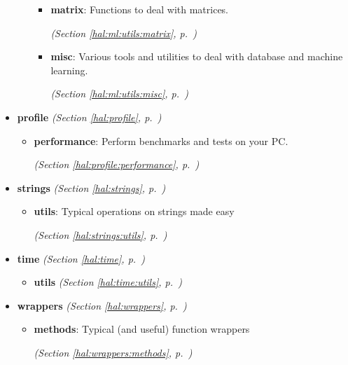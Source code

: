 \begin{itemize}
\begin{itemize}
      \begin{itemize}
    \setlength{\parskip}{0ex}
        \item \textbf{matrix}: Functions to deal with matrices. 


  \textit{(Section \ref{hal:ml:utils:matrix}, p.~\pageref{hal:ml:utils:matrix})}

        \item \textbf{misc}: Various tools and utilities to deal with database and machine learning. 


  \textit{(Section \ref{hal:ml:utils:misc}, p.~\pageref{hal:ml:utils:misc})}

      \end{itemize}
  \end{itemize}
\item \textbf{profile}
  \textit{(Section \ref{hal:profile}, p.~\pageref{hal:profile})}

  \begin{itemize}
\setlength{\parskip}{0ex}
    \item \textbf{performance}: Perform benchmarks and tests on your PC. 


  \textit{(Section \ref{hal:profile:performance}, p.~\pageref{hal:profile:performance})}

  \end{itemize}
\item \textbf{strings}
  \textit{(Section \ref{hal:strings}, p.~\pageref{hal:strings})}

  \begin{itemize}
\setlength{\parskip}{0ex}
    \item \textbf{utils}: Typical operations on strings made easy 


  \textit{(Section \ref{hal:strings:utils}, p.~\pageref{hal:strings:utils})}

  \end{itemize}
\item \textbf{time}
  \textit{(Section \ref{hal:time}, p.~\pageref{hal:time})}

  \begin{itemize}
\setlength{\parskip}{0ex}
    \item \textbf{utils}
  \textit{(Section \ref{hal:time:utils}, p.~\pageref{hal:time:utils})}

  \end{itemize}
\item \textbf{wrappers}
  \textit{(Section \ref{hal:wrappers}, p.~\pageref{hal:wrappers})}

  \begin{itemize}
\setlength{\parskip}{0ex}
    \item \textbf{methods}: Typical (and useful) function wrappers 


  \textit{(Section \ref{hal:wrappers:methods}, p.~\pageref{hal:wrappers:methods})}

  \end{itemize}
\end{itemize}


